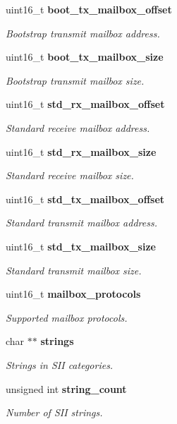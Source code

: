 \begin{DoxyCompactItemize}
uint16\-\_\-t {\bf boot\-\_\-tx\-\_\-mailbox\-\_\-offset}
\begin{DoxyCompactList}\small\item\em Bootstrap transmit mailbox address. \end{DoxyCompactList}\item 
uint16\-\_\-t {\bf boot\-\_\-tx\-\_\-mailbox\-\_\-size}
\begin{DoxyCompactList}\small\item\em Bootstrap transmit mailbox size. \end{DoxyCompactList}\item 
uint16\-\_\-t {\bf std\-\_\-rx\-\_\-mailbox\-\_\-offset}
\begin{DoxyCompactList}\small\item\em Standard receive mailbox address. \end{DoxyCompactList}\item 
uint16\-\_\-t {\bf std\-\_\-rx\-\_\-mailbox\-\_\-size}
\begin{DoxyCompactList}\small\item\em Standard receive mailbox size. \end{DoxyCompactList}\item 
uint16\-\_\-t {\bf std\-\_\-tx\-\_\-mailbox\-\_\-offset}
\begin{DoxyCompactList}\small\item\em Standard transmit mailbox address. \end{DoxyCompactList}\item 
uint16\-\_\-t {\bf std\-\_\-tx\-\_\-mailbox\-\_\-size}
\begin{DoxyCompactList}\small\item\em Standard transmit mailbox size. \end{DoxyCompactList}\item 
uint16\-\_\-t {\bf mailbox\-\_\-protocols}
\begin{DoxyCompactList}\small\item\em Supported mailbox protocols. \end{DoxyCompactList}\item 
char $\ast$$\ast$ {\bf strings}
\begin{DoxyCompactList}\small\item\em Strings in S\-I\-I categories. \end{DoxyCompactList}\item 
unsigned int {\bf string\-\_\-count}
\begin{DoxyCompactList}\small\item\em Number of S\-I\-I strings. \end{DoxyCompactList}\item 
$$
\end{DoxyCompactItemize}
